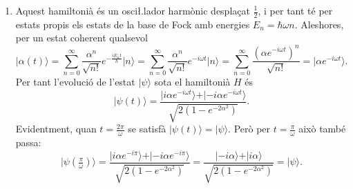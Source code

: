 \documentclass[12pt]{article}
\numberwithin{table}{section}
\numberwithin{figure}{section}
\numberwithin{equation}{section}
\newcommand{\ket}[1]{\vert {#1} \rangle}
\begin{document}
\begin{enumerate}[label=(\alph*), font=\bfseries \sffamily, wide, labelwidth=!, labelindent=0pt]
\item Aquest hamiltonià és un osci\l.lador harmònic desplaçat \( \frac{1}{2} \), i per tant té per estats propis els estats de la base de Fock amb energies \( E_n = \hbar \omega n \). Aleshores, per un estat coherent qualsevol
	\begin{equation*}
		\ket{\alpha(t)} = \sum_{n = 0}^{\infty} \frac{\alpha^n}{\sqrt{n!}} e^{-\frac{iE_n t}{\hbar}}\ket{n} = \sum_{n = 0}^\infty \frac{\alpha^n}{\sqrt{n!}} e^{-i\omega t} \ket{n} = \sum_{n = 0}^\infty \frac{(\alpha e^{-i\omega t})^n}{\sqrt{n!}} = \ket{\alpha e^{-i\omega t}}. 
	\end{equation*}
Per tant l'evolució de l'estat \( \ket{\psi} \) sota el hamiltonià \( H \) és
\begin{equation*}
	\ket{\psi(t)} = \frac{\ket{i\alpha e^{-i\omega t}} + \ket{- i\alpha e^{-i \omega t}}}{\sqrt{2(1 - e^{-2\alpha^2})}}.
\end{equation*}
Evidentment, quan \( t = \frac{2 \pi}{\omega} \) se satisfà \( \ket{\psi(t)} = \ket{\psi} \). Però per \( t = \frac{\pi}{\omega} \) això també passa:
\begin{equation*}
	\ket{\psi(\tfrac{\pi}{\omega})} = \frac{\ket{i\alpha e^{-i\pi}} + \ket{- i\alpha e^{-i \pi}}}{\sqrt{2(1 - e^{-2\alpha^2})}} = \frac{\ket{-i\alpha} + \ket{i\alpha}}{\sqrt{2(1 - e^{-2\alpha^2})}} = \ket{\psi}.
\end{equation*}


\end{enumerate}
\end{document}
